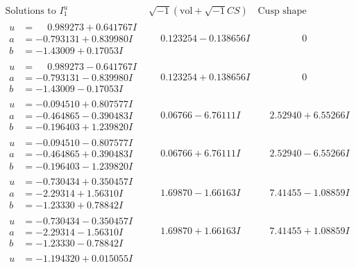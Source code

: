 \documentclass[1p]{elsarticle_modified}
\theoremstyle{definition}
\newcommand{\I}{\sqrt{-1}}
\begin{document}
$$\begin{array}{c|c|c}
\text{Solutions to }I^u_{1}& \I (\text{vol} + \sqrt{-1}CS) & \text{Cusp shape}\\
 \hline 
\begin{aligned}
u &= \phantom{-}0.989273 + 0.641767 I \\
a &= -0.793131 + 0.839980 I \\
b &= -1.43009 + 0.17053 I\end{aligned}
 & \phantom{-}0.123254 - 0.138656 I & \phantom{-0.000000 } 0 \\ \hline\begin{aligned}
u &= \phantom{-}0.989273 - 0.641767 I \\
a &= -0.793131 - 0.839980 I \\
b &= -1.43009 - 0.17053 I\end{aligned}
 & \phantom{-}0.123254 + 0.138656 I & \phantom{-0.000000 } 0 \\ \hline\begin{aligned}
u &= -0.094510 + 0.807577 I \\
a &= -0.464865 - 0.390483 I \\
b &= -0.196403 + 1.239820 I\end{aligned}
 & \phantom{-}0.06766 - 6.76111 I & \phantom{-}2.52940 + 6.55266 I \\ \hline\begin{aligned}
u &= -0.094510 - 0.807577 I \\
a &= -0.464865 + 0.390483 I \\
b &= -0.196403 - 1.239820 I\end{aligned}
 & \phantom{-}0.06766 + 6.76111 I & \phantom{-}2.52940 - 6.55266 I \\ \hline\begin{aligned}
u &= -0.730434 + 0.350457 I \\
a &= -2.29314 + 1.56310 I \\
b &= -1.23330 + 0.78842 I\end{aligned}
 & \phantom{-}1.69870 - 1.66163 I & \phantom{-}7.41455 - 1.08859 I \\ \hline\begin{aligned}
u &= -0.730434 - 0.350457 I \\
a &= -2.29314 - 1.56310 I \\
b &= -1.23330 - 0.78842 I\end{aligned}
 & \phantom{-}1.69870 + 1.66163 I & \phantom{-}7.41455 + 1.08859 I \\ \hline\begin{aligned}
u &= -1.194320 + 0.015055 I \\

\end{aligned}
\end{array}$$
\end{document}
